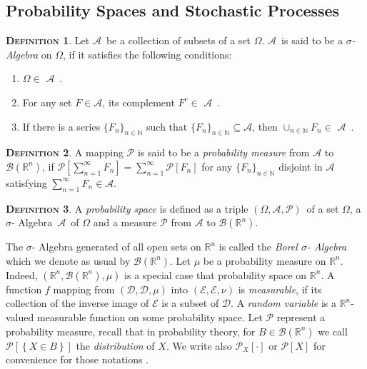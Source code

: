 \documentclass[a4paper, twoside, 11pt]{article}
\theoremstyle{definition}
\newtheorem{definition}{\scshape Definition}[section]
\def\AA{$\mathscr{A}$\ }
\newcommand{\compl}[1]{{#1}^{c}}
\def\sa{$\sigma$- Algebra\ }
\def\bs{$(\Omega, \mathscr{A}, \mathcal{P})$\ }
\def\bsigma{\mathscr{B}\brkt{\mathbb{R}^{n}}}
\newcommand{\sqbr}[1]{\left[ {#1} \right]}
\newcommand{\brkt}[1]{\left({#1} \right)}
\begin{document}
\subsection{Probability Spaces and Stochastic Processes }
\begin{definition}
  Let \AA be a collection of subsets of a set $\Omega$. \AA is said to be a \emph{$\sigma$- Algebra} on $\Omega$, if it satisfies the following conditions:
  \begin{enumerate}[topsep=0pt, itemsep=-1ex, partopsep=1ex, parsep=1ex, label=(\roman*)]
	\item $\Omega \in $ \AA.
	\item For any set $F \in \mathscr{A}$, its complement $\compl{F} \in$ \AA.
	\item If there is a series $\{F_n\}_{n\in \mathbb{N}}$ such that $\{F_n\}_{n \in \mathbb{N}} \subseteq \mathscr{A}$, then $\cup_{n \in \mathbb{N}}F_n \in $ \AA.
  \end{enumerate}
\end{definition}

\begin{definition}
  A mapping $\mathcal{P}$ is said to be a \emph{probability measure} from $\mathscr{A}$ to $\bsigma$, if $\mathcal{P}\sqbr{\sum_{n=1}^{\infty} F_n} = \sum_{n=1}^{\infty} \mathcal{P}\sqbr{F_n}$ for any $\{F_n\}_{n \in \mathbb{N}}$ disjoint in $\mathscr{A}$ satisfying $\sum_{n=1}^{\infty}F_n \in \mathscr{A}$. 
\end{definition}

\begin{definition}
  A \emph{probability space} is defined as a triple \bs of a set $\Omega$, a \sa \AA  of $\Omega$ and a measure $\mathcal{P}$ from $\mathscr{A}$ to $\bsigma$.
\end{definition}

The $\sigma$- Algebra generated of all open sets on $\mathbb{R}^{n}$ is called the \emph{Borel $\sigma$- Algebra} which we denote as usual by $\mathscr{B}\left(\mathbb{R}^{n}\right)$. Let $\mu$ be a probability measure on $\mathbb{R}^{n}$. Indeed, $\brkt{\mathbb{R}^{n}, \mathscr{B}\brkt{\mathbb{R}^{n}}, \mu}$ is a special case that probability space on $\mathbb{R}^{n}$. A function $f$ mapping from $\brkt{\mathcal{D}, \mathscr{D}, \mu}$ into $\brkt{\mathcal{E}, \mathscr{E}, \nu}$ is \emph{measurable}, if its collection of the inverse image of $\mathscr{E}$ is a subset of $\mathscr{D}$. A \emph{random variable} is a $\mathbb{R}^{n}$-valued measurable function on some probability space. Let $\mathcal{P}$ represent a probability measure, recall that in probability theory, for $B \in \bsigma$ we call $\mathcal{P}\sqbr{\left\{X \in B\right\}}$ the \emph{distribution} of $X$. We write also $\mathcal{P}_X \sqbr{\cdot}$ or $\mathcal{P}\sqbr{X}$ for convenience for those notations .
\end{document}
